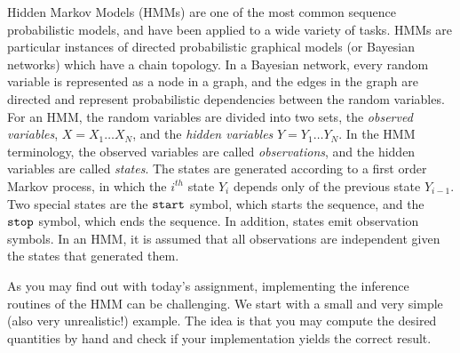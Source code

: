 
Hidden Markov Models (HMMs) are one of the most common sequence
probabilistic models, and have been applied to a wide variety of
tasks. HMMs are particular instances of directed probabilistic graphical models (or Bayesian networks) which have a chain topology. 
In a
Bayesian network, every random variable is represented as a node in a
graph, and the edges in the graph are directed and represent
probabilistic dependencies between the random variables. For an HMM, the random variables are divided into two sets, the 
\emph{observed variables}, $X = X_1\ldots X_N$, 
and the \emph{hidden variables} $Y = Y_1\ldots Y_N$.
In the HMM
terminology, the observed variables are called \emph{observations}, and the
hidden variables are called \emph{states}. 
The states are generated according to a first order Markov process, in which the $i^{th}$ state $Y_i$ depends only 
of the previous state $Y_{i-1}$. 
Two special states are the ${\tt start}$ symbol,
which starts the sequence, and 
the ${\tt stop}$ symbol, which ends the sequence. 
In addition, states emit observation symbols. In an HMM, it is assumed that all
observations are independent given the states
that generated them.


As you may find out with today's assignment, 
implementing the inference routines of the HMM can be challenging. We start with a small and very
simple (also very unrealistic!) example. The idea is that you may compute the desired
quantities by hand and check if your implementation yields the correct result. 

